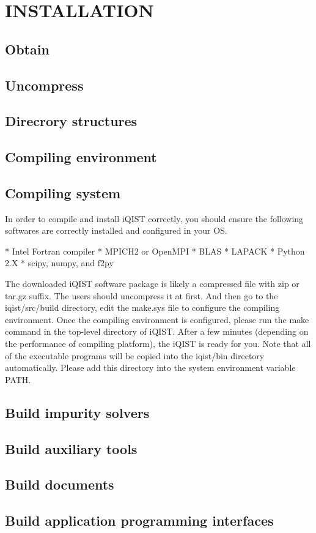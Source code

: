 \chapter{INSTALLATION}
\section{Obtain}
\section{Uncompress}
\section{Direcrory structures}
\section{Compiling environment}

\section{Compiling system}

In order to compile and install iQIST correctly, you should ensure the
following softwares are correctly installed and configured in your OS.

* Intel Fortran compiler
* MPICH2 or OpenMPI
* BLAS
* LAPACK
* Python 2.X
* scipy, numpy, and f2py

The downloaded iQIST software package is likely a compressed file with zip
or tar.gz suffix. The users should uncompress it at first. And then go to
the iqist/src/build directory, edit the make.sys file to configure the
compiling environment. Once the compiling environment is configured,
please run the make command in the top-level directory of iQIST. After a
few minutes (depending on the performance of compiling platform), the
iQIST is ready for you. Note that all of the executable programs will be
copied into the iqist/bin directory automatically. Please add this
directory into the system environment variable PATH.

\section{Build impurity solvers}
\section{Build auxiliary tools}
\section{Build documents}
\section{Build application programming interfaces}
